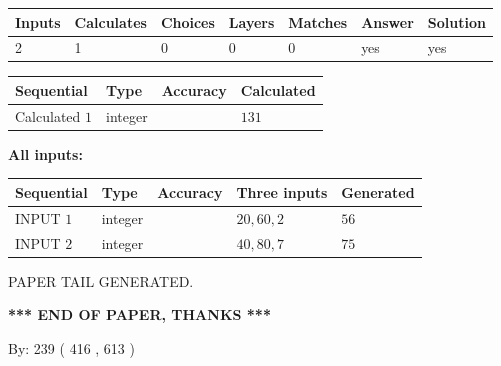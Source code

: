 \documentclass{ctexart}
\begin{document}
   
\noindent\begin{tabular}{|l|l|l|l|l|l|l|}
 \hline
Inputs & Calculates & Choices & Layers & Matches & Answer & Solution \\ \hline
 2  & 
 1  & 
 0
  & 
 0  & 
 0  & 
  yes & 
  yes 
  \\ \hline
 \end{tabular}
   
   
   
   
\noindent{}
   
   
  
  
\noindent\begin{tabular}{|l|l|l|l|}
\hline
 Sequential & Type & Accuracy & Calculated \\ 
\hline
 
 
  Calculated $  1 $ & integer &  & 
  $ 131 $ 
 \\  \hline  
 \end{tabular}
   
   
   
   
\noindent\vspace{0.1in}\hspace{-0.08in} {\textbf{\Large{All inputs: }}}
   
   
  
  
\noindent\begin{tabular}{|l|l|l|l|l|}
\hline
 Sequential & Type & Accuracy & Three inputs & Generated \\ 
\hline
 
 
  INPUT $  1 $ & integer &  & $
 20
 , 
 60
 , 
 2
 $ & $ 56 $ 
 \\  \hline  
 
 
  INPUT $  2 $ & integer &  & $
 40
 , 
 80
 , 
 7
 $ & $ 75 $ 
 \\  \hline  
 \end{tabular}
   
   
   
   
   
   
 \vspace{0.2in}
 
   
   
\vspace{2.0in} PAPER TAIL GENERATED.
   
   
   
   
\vspace{1.0in} 
{\textbf{\large{ *** END OF PAPER, THANKS *** }}} 
   
   
\hspace{1.0in} By: 
 239 ( 416 ,  613 )
   
\end{document}
